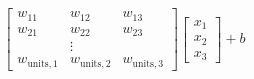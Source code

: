 \documentclass[preview]{standalone}
\begin{document}
\begin{align*}
\begin{bmatrix} w_{11} & w_{12} & w_{13} \\
                       w_{21} & w_{22} & w_{23} \\ & \vdots & \\
                       w_{\text{units}, 1} & w_{\text{units}, 2} & w_{\text{units}, 3}
                       \end{bmatrix} \begin{bmatrix} x_1 \\ x_2 \\ x_3\end{bmatrix} + b
\end{align*}
\end{document}
